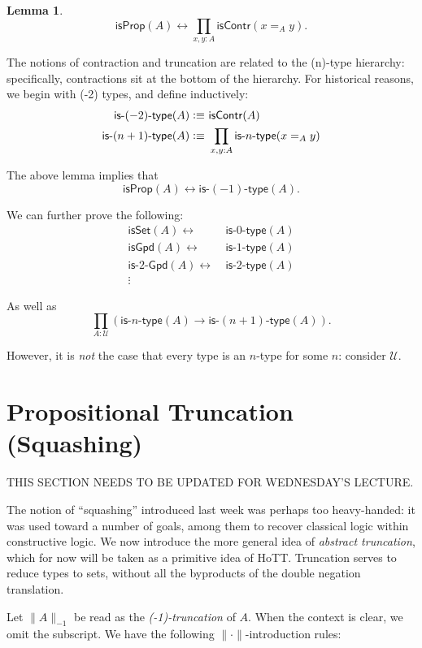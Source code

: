\documentclass[11pt]{article}
\newcommand*{\isSet}{\mathsf{isSet}}
\newcommand*{\isProp}{\mathsf{isProp}}
\newcommand*{\isContr}{\mathsf{isContr}}
\newcommand*{\isNtype}[1]{\mathsf{is}\mbox{-}#1\mbox{-}\mathsf{type}}
\newtheorem{lemma}{Lemma}
\begin{document}
\begin{lemma}
 $$\isProp(A)\leftrightarrow \prod_{x,y:A}\isContr(x=_A y).$$
\end{lemma}

The notions of contraction and truncation are related to the (n)-type hierarchy: 
specifically, contractions sit at the bottom of the hierarchy. For historical reasons,
we begin with (-2) types, and define inductively:
\begin{align*}
 \isNtype{(-2)}(A)\defeq&\ \isContr(A) \\ %
 \isNtype{(n+1)}(A)\defeq &\ \prod_{x,y:A}\isNtype{n}(x=_A y)
\end{align*}

The above lemma implies that
$$\isProp(A)\leftrightarrow \isNtype{(-1)}(A).$$

We can further prove the following:
\begin{align*}
 \isSet(A)\leftrightarrow &\ \isNtype{0}(A) \\
 \mathsf{isGpd}(A)\leftrightarrow &\ \isNtype{1}(A) \\
 \mathsf{is}\mbox{-}2\mbox{-}\mathsf{Gpd}(A)\leftrightarrow &\ \isNtype{2}(A) \\
 \vdots\ & 
\end{align*}

As well as
$$\prod_{A:\mathcal{U}}\left( \isNtype{n}(A)\to \isNtype{(n+1)}(A) \right).$$

However, it is \emph{not} the case that every type is an $n$-type for some $n$: consider $\mathcal{U}$.

\section{Propositional Truncation (Squashing)}
THIS SECTION NEEDS TO BE UPDATED FOR WEDNESDAY'S LECTURE.

The notion of ``squashing'' introduced last week was perhaps too heavy-handed: it was used toward
a number of goals, among them to recover classical logic within constructive logic. We now introduce
the more general idea of \emph{abstract truncation}, which for now will be taken as a primitive
idea of HoTT. Truncation serves to reduce types to sets, without all the byproducts of the double negation translation.

Let $\|A\|_{-1}$ be read as the \emph{(-1)-truncation} of $A$. When the context is clear, we omit
the subscript. We have the following $\|\cdot \|$-introduction rules:
\end{document}
